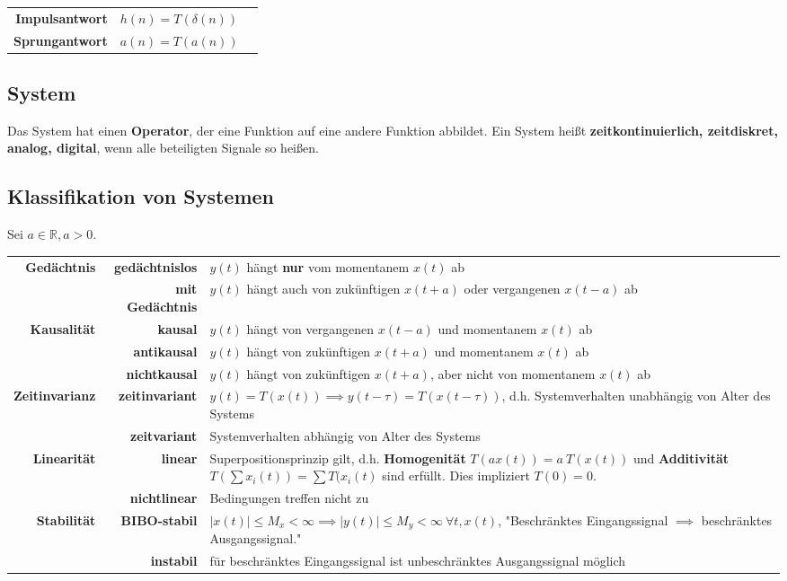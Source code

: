 \documentclass[10pt,a4paper]{article}
\begin{document}
\begin{tabular}{r >{\centering\arraybackslash} p{7cm} l}
	\textbf{Impulsantwort} & $h(n) = T(\delta(n))$ \\
	\textbf{Sprungantwort} & $a(n) = T(a(n))$ \\
\end{tabular} 

\subsection*{System}
	Das System hat einen \textbf{Operator}, der eine Funktion auf eine andere Funktion abbildet. Ein System heißt \textbf{zeitkontinuierlich, zeitdiskret, analog, digital}, wenn alle beteiligten Signale so heißen.
\subsection*{Klassifikation von Systemen}
Sei $a \in \mathbb R, a > 0$.
\vspace{.5em}

\begin{centering}
\begin{tabular}{r | r | p{11.5cm}}
	\textbf{Gedächtnis} &
	\textbf{gedächtnislos} & $y(t)$ hängt \textbf{nur} vom momentanem $x(t)$ ab \\
	& \textbf{mit Gedächtnis} & $y(t)$ hängt auch von zukünftigen $x(t + a)$ oder vergangenen $x(t - a)$ ab \\

	\textbf{Kausalität} &
	\textbf{kausal} & $y(t)$ hängt von vergangenen $x(t - a)$ und momentanem $x(t)$ ab \\
	& \textbf{antikausal} & $y(t)$ hängt von zukünftigen $x(t + a)$ und momentanem $x(t)$ ab \\
	& \textbf{nichtkausal} & $y(t)$ hängt von zukünftigen $x(t + a)$, aber nicht von momentanem $x(t)$ ab \\

	\textbf{Zeitinvarianz} &
	\textbf{zeitinvariant} & $y(t) = T(x(t)) \implies y(t-\tau)=T(x(t-\tau))$, d.h.
	Systemverhalten unabhängig von Alter des Systems \\
	& \textbf{zeitvariant} & Systemverhalten abhängig von Alter des Systems\\

	\textbf{Linearität} &
	\textbf{linear} & Superpositionsprinzip gilt, d.h.
	\textbf{Homogenität} $T(ax(t)) = a ~ T(x(t))$ und
	\textbf{Additivität} $T \left(\sum x_i(t) \right) = \sum T(x_i(t)$ sind erfüllt. Dies impliziert $T(0) = 0$. \\
	& \textbf{nichtlinear} & Bedingungen treffen nicht zu \\

	\textbf{Stabilität} &
	\textbf{BIBO-stabil} & $\vert x(t)\vert\leq M_x <\infty \implies \vert y(t)\vert\leq M_y < \infty ~ \forall t, x(t)$, "Beschränktes Eingangssignal $\implies$ beschränktes Ausgangssignal." \\
	& \textbf{instabil} & für beschränktes Eingangssignal ist unbeschränktes Ausgangssignal möglich
\end{tabular}
\end{centering}
\end{document}
